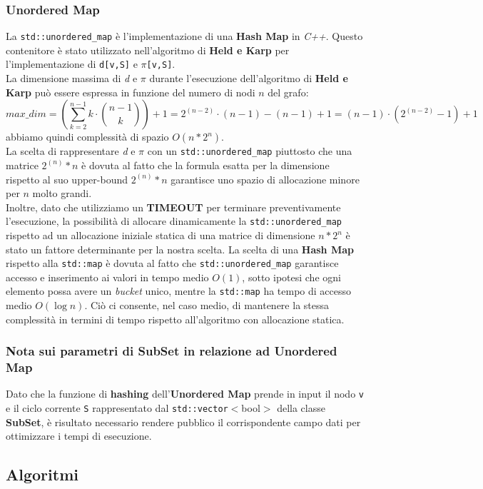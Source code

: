 \documentclass[]{article}
\begin{document}
\subsubsection{Unordered Map}
La \verb|std::unordered_map| è l'implementazione di una \textbf{Hash Map} in \textit{C++}. Questo contenitore è stato utilizzato nell'algoritmo di \textbf{Held e Karp} per l'implementazione di \verb|d[v,S]| e $\pi$\verb|[v,S]|.\\
La dimensione massima di \textit{d} e $\pi$ durante l'esecuzione dell'algoritmo di \textbf{Held e Karp} può essere espressa in funzione del numero di nodi $n$ del grafo:
$$max\_dim = (\sum_{k=2}^{n-1}k\cdot\binom{n-1}{k}) + 1 = 2^{(n-2)} \cdot (n-1) - (n-1) +1 = (n-1)\cdot(2^{(n-2)}-1) +1$$ 
abbiamo quindi complessità di spazio $O(n * 2^{n})$.\\
La scelta di rappresentare \textit{d} e $\pi$ con un \verb|std::unordered_map| piuttosto che una matrice $2^{(n)} * n$ è dovuta al fatto che la formula esatta per la dimensione rispetto al suo upper-bound $2^{(n)} * n$ garantisce uno spazio di allocazione minore per $n$ molto grandi.\\
Inoltre, dato che utilizziamo un \textbf{TIMEOUT} per terminare preventivamente l'esecuzione, la possibilità di allocare dinamicamente la \verb|std::unordered_map| rispetto ad un allocazione iniziale statica di una matrice di dimensione $n * 2^{n}$ è stato un fattore determinante per la nostra scelta.
La scelta di una \textbf{Hash Map} rispetto alla \verb|std::map| è dovuta al fatto che \verb|std::unordered_map| garantisce accesso e inserimento ai valori in tempo medio $O(1)$, sotto ipotesi che ogni elemento possa avere un \textit{bucket} unico, mentre la \verb|std::map| ha tempo di accesso medio $O(\log{n})$. Ciò ci consente, nel caso medio, di mantenere la stessa complessità in termini di tempo rispetto all'algoritmo con allocazione statica.\\
\subsubsection{Nota sui parametri di SubSet in relazione ad Unordered Map}
Dato che la funzione di \textbf{hashing} dell'\textbf{Unordered Map} prende in input il nodo \verb|v| e il ciclo corrente \verb|S| rappresentato dal \verb|std::vector|$<$bool$>$ della classe \textbf{SubSet}, è risultato necessario rendere pubblico il corrispondente campo dati per ottimizzare i tempi di esecuzione.

\newpage
\subsection{Algoritmi}
\end{document}
